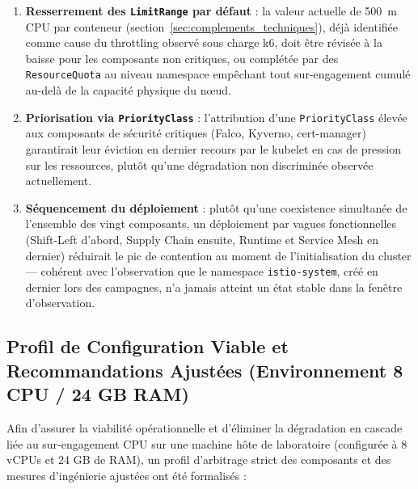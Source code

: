 \begin{enumerate}
    \item \textbf{Resserrement des \texttt{LimitRange} par défaut} : la valeur actuelle de 500~m CPU par conteneur (section~\ref{sec:complements_techniques}), déjà identifiée comme cause du throttling observé sous charge k6, doit être révisée à la baisse pour les composants non critiques, ou complétée par des \texttt{ResourceQuota} au niveau namespace empêchant tout sur-engagement cumulé au-delà de la capacité physique du nœud.
    \item \textbf{Priorisation via \texttt{PriorityClass}} : l'attribution d'une \texttt{PriorityClass} élevée aux composants de sécurité critiques (Falco, Kyverno, cert-manager) garantirait leur éviction en dernier recours par le kubelet en cas de pression sur les ressources, plutôt qu'une dégradation non discriminée observée actuellement.
    \item \textbf{Séquencement du déploiement} : plutôt qu'une coexistence simultanée de l'ensemble des vingt composants, un déploiement par vagues fonctionnelles (Shift-Left d'abord, Supply Chain ensuite, Runtime et Service Mesh en dernier) réduirait le pic de contention au moment de l'initialisation du cluster — cohérent avec l'observation que le namespace \texttt{istio-system}, créé en dernier lors des campagnes, n'a jamais atteint un état stable dans la fenêtre d'observation.
\end{enumerate}

\subsection{Profil de Configuration Viable et Recommandations Ajustées (Environnement 8 CPU / 24 GB RAM)}
\label{subsec:recommandations_ajustees_machine}

Afin d'assurer la viabilité opérationnelle et d'éliminer la dégradation en cascade liée au sur-engagement CPU sur une machine hôte de laboratoire (configurée à 8 vCPUs et 24 GB de RAM), un profil d'arbitrage strict des composants et des mesures d'ingénierie ajustées ont été formalisés :

